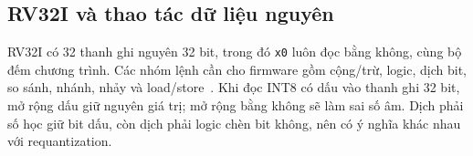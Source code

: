\subsection{RV32I và thao tác dữ liệu nguyên}
RV32I có 32 thanh ghi nguyên 32 bit, trong đó \texttt{x0} luôn đọc bằng không, cùng bộ đếm chương trình. Các nhóm lệnh cần cho firmware gồm cộng/trừ, logic, dịch bit, so sánh, nhánh, nhảy và load/store~\cite{waterman2014risc}. Khi đọc INT8 có dấu vào thanh ghi 32 bit, mở rộng dấu giữ nguyên giá trị; mở rộng bằng không sẽ làm sai số âm. Dịch phải số học giữ bit dấu, còn dịch phải logic chèn bit không, nên có ý nghĩa khác nhau với requantization.
